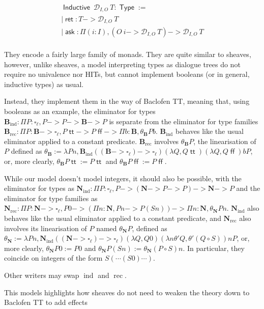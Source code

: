 \documentclass[11pt]{article}
\DeclareMathOperator{\Type}{\mathsf{Type}}
\DeclareMathOperator{\ask}{\mathsf{ask}}
\DeclareMathOperator{\Inductive}{\mathsf{Inductive}}
\DeclareMathOperator{\ret}{\mathsf{ret}}
\DeclareMathOperator{\rec}{rec}
\DeclareMathOperator{\ind}{ind}
\DeclareMathOperator{\true}{\mathsf{tt}}
\DeclareMathOperator{\false}{\mathsf{ff}}
\newcommand{\0}{\mathbf{0}}
\newcommand{\1}{\mathbf{1}}
\newcommand{\nat}{\mathbf{N}}
\newcommand{\bool}{\mathbf{B}}
\begin{document}
$$
\begin{array}{l}
    \Inductive\ \mathcal{D}_{I,O}\ T : \Type := \\
    | \ret : T -> \mathcal{D}_{I,O}\ T\\
    | \ask : \Pi (i : I),(O\ i -> \mathcal{D}_{I,O}\ T) -> \mathcal{D}_{I,O}\ T\\
\end{array}
$$

They encode a fairly large family of monads. They are quite similar to sheaves, however, unlike sheaves, a model interpreting types as dialogue trees do not require no univalence nor HITs, but cannot implement booleans (or in general, inductive types) as usual.

Instead, they implement them in the way of Baclofen TT, meaning that, using booleans as an example, the eliminator for types $\bool_{\ind} : \Pi P : \square_\ell, P -> P -> \bool -> P $ is separate from the eliminator for type families $\bool_{\rec} : \Pi P : \bool -> \square_\ell, P \true -> P \false -> \Pi b : \bool, \theta_\bool P b$. $\bool_{\ind}$ behaves like the usual eliminator applied to a constant predicate. $\bool_{\rec}$ involves $\theta_\bool P$, the linearisation of $P$ defined as $\theta_\bool:= \lambda P n, \bool_{\ind} ((\bool ->\square_\ell) -> \square_\ell) (\lambda Q, Q \true) (\lambda Q, Q \false) b P$, or, more clearly, $\theta_\bool P \true := P \true$ and $\theta_\bool P \false :=  P \false$.


While our model doesn't model integers, it should also be possible, with the eliminator for types as $\nat_{\ind} : \Pi P : \square_\ell, P -> (\nat ->P -> P) -> \nat -> P $ and the eliminator for type families as $\nat_{\rec} : \Pi P : \nat -> \square_\ell, P 0 -> (\Pi n :\nat, P n -> P (S n)) -> \Pi n : \nat, \theta_\nat P n$. $\nat_{\ind}$ also behaves like the usual eliminator applied to a constant predicate, and $\nat_{\rec}$ also involves its linearisation of $P$ named $\theta_\nat P$, defined as $\theta_\nat:= \lambda P n, \nat_{\ind} ((\nat ->\square_\ell) -> \square_\ell) (\lambda Q, Q 0) (\lambda n \theta' Q, \theta' (Q\circ S)) n P$, or, more clearly, $\theta_\nat P 0 := P 0$ and $\theta_\nat P (S n) := \theta_\nat (P\circ S) n$. In particular, they coincide on  integers of the form $S( \cdots (S 0)\cdots)$.

Other writers may swap $\ind$ and $\rec$.

This models highlights how sheaves do not need to weaken the theory down to Baclofen TT to add effects
\end{document}
